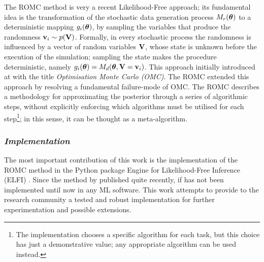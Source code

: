 The ROMC method \autocite{Ikonomov2019} is very a recent Likelihood-Free
approach; its fundamental idea is the transformation of the stochastic
data generation process $M_r(\boldsymbol{\theta})$ to a deterministic mapping
$g_i(\boldsymbol{\theta})$, by sampling the variables that produce the randomness
$\mathbf{v}_i \sim p(\mathbf{V})$. Formally, in every stochastic process the randomness
is influenced by a vector of random variables $\mathbf{V}$, whose state is
unknown before the execution of the simulation; sampling
the state makes the procedure deterministic, namely
$g_i(\boldsymbol{\theta}) = M_d(\boldsymbol{\theta}, \mathbf{V}=\mathbf{v}_i)$. This approach initially introduced
at \autocite{Meeds2015} with the title \textit{Optimisation Monte
Carlo (OMC)}. The ROMC extended this approach by resolving a
fundamental failure-mode of OMC. The ROMC describes a methodology for
approximating the posterior through a series of algorithmic steps, without
explicitly enforcing which algorithms must be utilised for each
step\footnote{The implementation chooses a specific algorithm for each
  task, but this choice has just a demonstrative value; any appropriate algorithm can be used instead.}; in this sense, it can be
thought as a meta-algorithm.

\subsubsection*{\textit{Implementation}}

The most important contribution of this work is the implementation of
the ROMC method in the Python package Engine for Likelihood-Free
Inference (ELFI) \autocite{1708.00707}. Since the method by published quite recently, if has not been implemented until now in any ML software. This work attempts to provide to the research community a
tested and robust implementation for further experimentation and
possible extensions.

